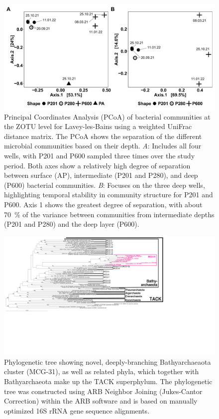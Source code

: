 \newpage
\null
\vfill
\begin{figure}[H]
\centering
\includegraphics[width=\textwidth]{chapters/06_appendix/SI_C2/PCoA_bac_wuni_all_OTUs.pdf}
\caption{Principal Coordinates Analysis (PCoA) of bacterial communities at the ZOTU level for Lavey-les-Bains using a weighted UniFrac distance matrix. The PCoA shows the separation of the different microbial communities based on their depth.
\textit{A}: Includes all four wells, with P201 and P600 sampled three times over the study period. Both axes show a relatively high degree of separation between surface (AP), intermediate (P201 and P280), and deep (P600) bacterial communities.
\textit{B}: Focuses on the three deep wells, highlighting temporal stability in community structure for P201 and P600. Axis 1 shows the greatest degree of separation, with about \SI{70}{\percent} of the variance between communities from intermediate depths (P201 and P280) and the deep layer (P600).}
\label{figSI:PCoA_bac}
\end{figure}
\vfill 

\newpage
\null
\vfill
\begin{figure}[H]
\centering
\includegraphics[width=\textwidth]{chapters/06_appendix/SI_C2/LLB_NewBathyarchaeotaGroup.pdf}
\caption{
Phylogenetic tree showing novel, deeply-branching Bathyarchaeaota cluster (MCG-31), as well as related phyla, which together with Bathyarchaeota make up the TACK superphylum.
The phylogenetic tree was constructed using ARB Neighbor Joining (Jukes-Cantor Correction) within the ARB software and is based on manually optimized 16S rRNA gene sequence alignments.
}
\label{figSI:MCG31}
\end{figure}
\vfill 

